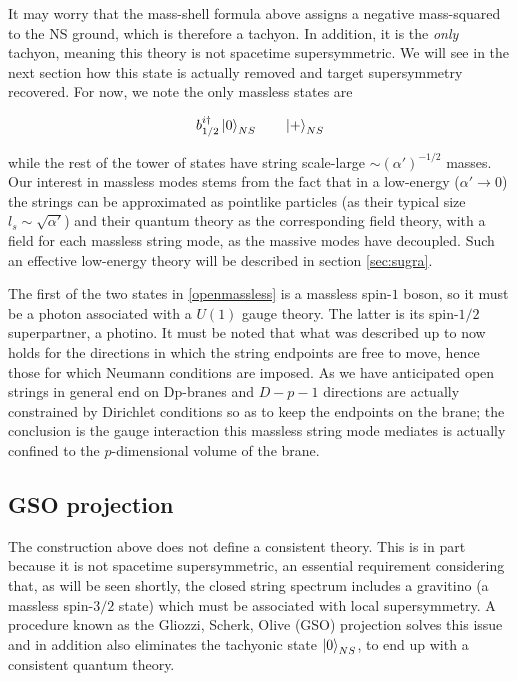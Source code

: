 It may worry that the mass-shell formula above assigns a negative mass-squared to the NS ground, which is therefore a tachyon. In addition, it is the \emph{only} tachyon, meaning this theory is not spacetime supersymmetric. We will see in the next section how this state is actually removed and target supersymmetry recovered. For now, we note the only massless states are

\begin{equation}
	b_{1/2}^{i\dagger} \ket{0}_{NS} \quad \quad \ket{+}_{NS}
	\label{openmassless}
\end{equation}

while the rest of the tower of states have string scale-large $\sim (\alpha')^{-1/2}$ masses. Our interest in massless modes stems from the fact that in a low-energy ($\alpha' \rightarrow 0$) the strings can be approximated as pointlike particles (as their typical size $l_s \sim \sqrt{\alpha'}$) and their quantum theory as the corresponding field theory, with a field for each massless string mode, as the massive modes have decoupled. Such an effective low-energy theory will be described in section \ref{sec:sugra}.



The first of the two states in \eqref{openmassless} is a massless spin-$1$ boson, so it must be a photon associated with a $U(1)$ gauge theory. The latter is its spin-$1/2$ superpartner, a photino. It must be noted that what was described up to now holds for the directions in which the string endpoints are free to move, hence those for which Neumann conditions are imposed. As we have anticipated open strings in general end on Dp-branes and $D-p-1$ directions are actually constrained by Dirichlet conditions so as to keep the endpoints on the brane; the conclusion is the gauge interaction this massless string mode mediates is actually confined to the $p$-dimensional volume of the brane.

\subsection{GSO projection}

The construction above does not define a consistent theory. This is in part because it is not spacetime supersymmetric, an essential requirement considering that, as will be seen shortly, the closed string spectrum includes a gravitino (a massless spin-$3/2$ state) which must be associated with local supersymmetry. A procedure known as the Gliozzi, Scherk, Olive (GSO) projection solves this issue and in addition also eliminates the tachyonic state $\ket{0}_{NS}$, to end up with a consistent quantum theory.

